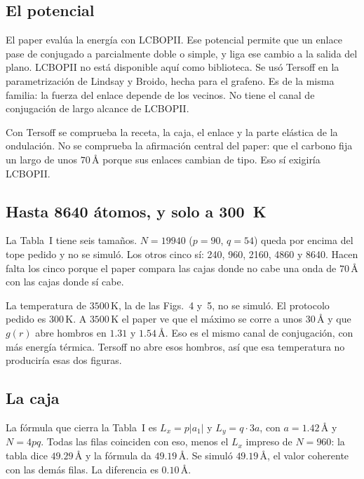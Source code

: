 \documentclass[11pt,a4paper]{article}
\begin{document}
\subsection{El potencial}

El paper evalúa la energía con LCBOPII.
Ese potencial permite que un enlace pase de conjugado a parcialmente doble o simple, y liga ese cambio a la salida del plano.
LCBOPII no está disponible aquí como biblioteca.
Se usó Tersoff en la parametrización de Lindsay y Broido, hecha para el grafeno.
Es de la misma familia: la fuerza del enlace depende de los vecinos.
No tiene el canal de conjugación de largo alcance de LCBOPII.

Con Tersoff se comprueba la receta, la caja, el enlace y la parte elástica de la ondulación.
No se comprueba la afirmación central del paper: que el carbono fija un largo de unos $70\,\text{\AA}$ porque sus enlaces cambian de tipo.
Eso sí exigiría LCBOPII.

\subsection{Hasta 8640 átomos, y solo a 300~K}

La Tabla~I tiene seis tamaños.
$N=19940$ ($p=90$, $q=54$) queda por encima del tope pedido y no se simuló.
Los otros cinco sí: 240, 960, 2160, 4860 y 8640.
Hacen falta los cinco porque el paper compara las cajas donde no cabe una onda de $70\,\text{\AA}$ con las cajas donde sí cabe.

La temperatura de $3500\,\mathrm{K}$, la de las Figs.~4 y~5, no se simuló.
El protocolo pedido es $300\,\mathrm{K}$.
A $3500\,\mathrm{K}$ el paper ve que el máximo se corre a unos $30\,\text{\AA}$ y que $g(r)$ abre hombros en $1.31$ y $1.54\,\text{\AA}$.
Eso es el mismo canal de conjugación, con más energía térmica.
Tersoff no abre esos hombros, así que esa temperatura no produciría esas dos figuras.

\subsection{La caja}

La fórmula que cierra la Tabla~I es $L_x=p|a_1|$ y $L_y=q\cdot 3a$, con $a=1.42\,\text{\AA}$ y $N=4pq$.
Todas las filas coinciden con eso, menos el $L_x$ impreso de $N=960$: la tabla dice $49.29\,\text{\AA}$ y la fórmula da $49.19\,\text{\AA}$.
Se simuló $49.19\,\text{\AA}$, el valor coherente con las demás filas.
La diferencia es $0.10\,\text{\AA}$.
\end{document}
